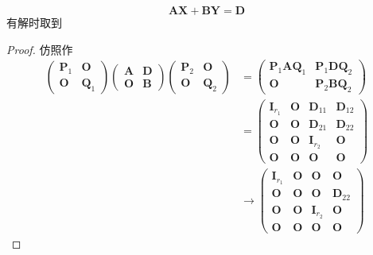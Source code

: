 {\begin{enumerate}[label=\arabic*)]
\[                  \bm{AX}+\bm{BY} = \bm{D}
              \]
              有解时取到\begin{proof}
                  仿照作
                  \begin{align*}
                      \begin{pmatrix}
                          \bm{P}_1 & \bm{O} \\\bm{O} & \bm{Q}_1
                      \end{pmatrix}
                      \begin{pmatrix}
                          \bm{A} & \bm{D} \\
                          \bm{O} & \bm{B}
                      \end{pmatrix}
                      \begin{pmatrix}
                          \bm{P}_2 & \bm{O} \\\bm{O} & \bm{Q}_2
                      \end{pmatrix}
                       & =\begin{pmatrix}
                              \bm{P}_1\bm{AQ}_1 & \bm{P}_1\bm{DQ}_2 \\
                              \bm{O}            & \bm{P}_2\bm{BQ}_2
                          \end{pmatrix}              \\
                       & =\begin{pmatrix}
                              \bm{I}_{r_1} & \bm{O} & \bm{D}_{11}  & \bm{D}_{12} \\
                              \bm{O}       & \bm{O} & \bm{D}_{21}  & \bm{D}_{22} \\
                              \bm{O}       & \bm{O} & \bm{I}_{r_2} & \bm{O}      \\
                              \bm{O}       & \bm{O} & \bm{O}       & \bm{O}
                          \end{pmatrix} \\
                       & \longrightarrow
                      \begin{pmatrix}
                          \bm{I}_{r_1} & \bm{O} & \bm{O}       & \bm{O}      \\
                          \bm{O}       & \bm{O} & \bm{O}       & \bm{D}_{22} \\
                          \bm{O}       & \bm{O} & \bm{I}_{r_2} & \bm{O}      \\
                          \bm{O}       & \bm{O} & \bm{O}       & \bm{O}

\end{pmatrix}
\end{align*}
\end{proof}
\end{enumerate}}
